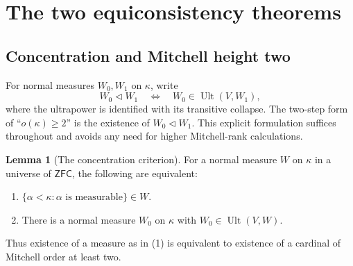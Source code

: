 \documentclass[11pt,letterpaper]{article}
\theoremstyle{definition}
\newtheorem{lemma}[definition]{Lemma}
\numberwithin{equation}{section}
\newcommand{\ZFC}{\mathsf{ZFC}}
\newcommand{\Ult}{\operatorname{Ult}}
\begin{document}
\section{The two equiconsistency theorems}\label{sec:calibration}

\subsection{Concentration and Mitchell height two}

For normal measures $W_0,W_1$ on $\kappa$, write
\[
 W_0\mathrel{\triangleleft}W_1
 \quad\Longleftrightarrow\quad W_0\in\Ult(V,W_1),
\]
where the ultrapower is identified with its transitive collapse. The
two-step form of ``$o(\kappa)\ge2$'' is the existence of
$W_0\triangleleft W_1$. This explicit formulation suffices throughout
and avoids any need for higher Mitchell-rank calculations.

\begin{lemma}[The concentration criterion]\label{lem:Mitchell}
For a normal measure $W$ on $\kappa$ in a universe of $\ZFC$, the
following are equivalent:
\begin{enumerate}
\item $\{\alpha<\kappa:\alpha\text{ is measurable}\}\in W$.
\item There is a normal measure $W_0$ on $\kappa$ with
$W_0\in\Ult(V,W)$.
\end{enumerate}
Thus existence of a measure as in (1) is equivalent to existence of a
cardinal of Mitchell order at least two.
\end{lemma}
\end{document}
